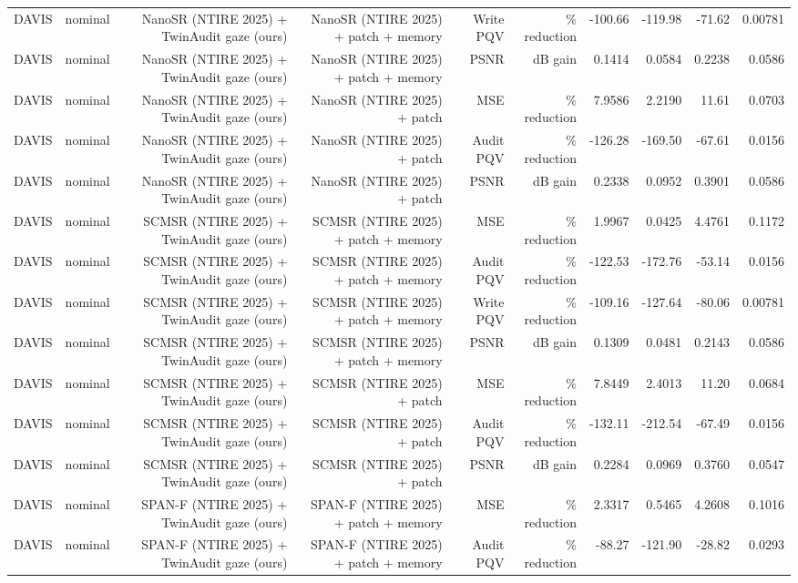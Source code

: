 \begin{table}[t]
\begin{tabular}{llrrrrrrrr}
DAVIS & nominal & NanoSR (NTIRE 2025) + TwinAudit gaze (ours) & NanoSR (NTIRE 2025) + patch + memory & Write PQV & \% reduction & -100.66 & -119.98 & -71.62 & 0.00781 \\
DAVIS & nominal & NanoSR (NTIRE 2025) + TwinAudit gaze (ours) & NanoSR (NTIRE 2025) + patch + memory & PSNR & dB gain & 0.1414 & 0.0584 & 0.2238 & 0.0586 \\
DAVIS & nominal & NanoSR (NTIRE 2025) + TwinAudit gaze (ours) & NanoSR (NTIRE 2025) + patch & MSE & \% reduction & 7.9586 & 2.2190 & 11.61 & 0.0703 \\
DAVIS & nominal & NanoSR (NTIRE 2025) + TwinAudit gaze (ours) & NanoSR (NTIRE 2025) + patch & Audit PQV & \% reduction & -126.28 & -169.50 & -67.61 & 0.0156 \\
DAVIS & nominal & NanoSR (NTIRE 2025) + TwinAudit gaze (ours) & NanoSR (NTIRE 2025) + patch & PSNR & dB gain & 0.2338 & 0.0952 & 0.3901 & 0.0586 \\
DAVIS & nominal & SCMSR (NTIRE 2025) + TwinAudit gaze (ours) & SCMSR (NTIRE 2025) + patch + memory & MSE & \% reduction & 1.9967 & 0.0425 & 4.4761 & 0.1172 \\
DAVIS & nominal & SCMSR (NTIRE 2025) + TwinAudit gaze (ours) & SCMSR (NTIRE 2025) + patch + memory & Audit PQV & \% reduction & -122.53 & -172.76 & -53.14 & 0.0156 \\
DAVIS & nominal & SCMSR (NTIRE 2025) + TwinAudit gaze (ours) & SCMSR (NTIRE 2025) + patch + memory & Write PQV & \% reduction & -109.16 & -127.64 & -80.06 & 0.00781 \\
DAVIS & nominal & SCMSR (NTIRE 2025) + TwinAudit gaze (ours) & SCMSR (NTIRE 2025) + patch + memory & PSNR & dB gain & 0.1309 & 0.0481 & 0.2143 & 0.0586 \\
DAVIS & nominal & SCMSR (NTIRE 2025) + TwinAudit gaze (ours) & SCMSR (NTIRE 2025) + patch & MSE & \% reduction & 7.8449 & 2.4013 & 11.20 & 0.0684 \\
DAVIS & nominal & SCMSR (NTIRE 2025) + TwinAudit gaze (ours) & SCMSR (NTIRE 2025) + patch & Audit PQV & \% reduction & -132.11 & -212.54 & -67.49 & 0.0156 \\
DAVIS & nominal & SCMSR (NTIRE 2025) + TwinAudit gaze (ours) & SCMSR (NTIRE 2025) + patch & PSNR & dB gain & 0.2284 & 0.0969 & 0.3760 & 0.0547 \\
DAVIS & nominal & SPAN-F (NTIRE 2025) + TwinAudit gaze (ours) & SPAN-F (NTIRE 2025) + patch + memory & MSE & \% reduction & 2.3317 & 0.5465 & 4.2608 & 0.1016 \\
DAVIS & nominal & SPAN-F (NTIRE 2025) + TwinAudit gaze (ours) & SPAN-F (NTIRE 2025) + patch + memory & Audit PQV & \% reduction & -88.27 & -121.90 & -28.82 & 0.0293 \\

\end{tabular}
\end{table}

